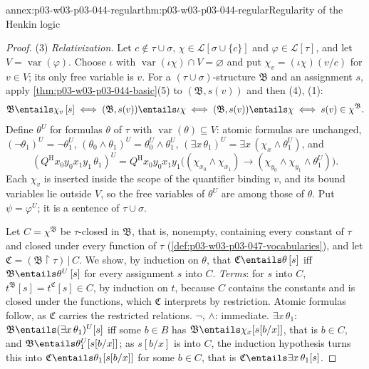\begin{annexitem}{annex:p03-w03-p03-044-regular}{thm:p03-w03-p03-044-regular}{Regularity of the Henkin logic}
\begin{proof}
(3) \emph{Relativization.}  Let \(c\notin\tau\cup\sigma\),
\(\chi\in\mathscr L[\sigma\cup\{c\}]\) and \(\varphi\in\mathscr L[\tau]\),
and let \(V=\operatorname{var}(\varphi)\).  Choose \(\iota\) with
\(\operatorname{var}(\iota\chi)\cap V=\varnothing\) and put
\(\chi_v=(\iota\chi)(v/c)\) for \(v\in V\); its only free variable is
\(v\).  For a \((\tau\cup\sigma)\)-structure \(\mathfrak B\) and an
assignment \(s\), apply \cref{thm:p03-w03-p03-044-basic}(5) to
\((\mathfrak B,s(v))\) and then (4), (1):
\[
 \mathfrak B\entails\chi_v\,[s]\iff(\mathfrak B,s(v))\entails\iota\chi
 \iff(\mathfrak B,s(v))\entails\chi\iff s(v)\in\chi^{\mathfrak B}.
\]
Define \(\theta^U\) for formulas \(\theta\) of \(\tau\) with
\(\operatorname{var}(\theta)\subseteq V\): atomic formulas are unchanged,
\((\neg\theta_1)^U=\neg\theta_1^U\),
\((\theta_0\land\theta_1)^U=\theta_0^U\land\theta_1^U\),
\((\exists x\,\theta_1)^U=\exists x\,(\chi_x\land\theta_1^U)\), and
\[
 (Q^{\mathrm H}x_0y_0x_1y_1\,\theta_1)^U=
 Q^{\mathrm H}x_0y_0x_1y_1\bigl((\chi_{x_0}\land\chi_{x_1})\to
 (\chi_{y_0}\land\chi_{y_1}\land\theta_1^U)\bigr).
\]
Each \(\chi_v\) is inserted inside the scope of the quantifier binding
\(v\), and its bound variables lie outside \(V\), so the free variables of
\(\theta^U\) are among those of \(\theta\).  Put \(\psi=\varphi^U\); it is a
sentence of \(\tau\cup\sigma\).

Let \(C=\chi^{\mathfrak B}\) be \(\tau\)-closed in \(\mathfrak B\), that is,
nonempty, containing every constant of \(\tau\) and closed under every
function of \(\tau\) (\cref{def:p03-w03-p03-047-vocabularies}), and let
\(\mathfrak C=(\mathfrak B\restriction\tau)\,|\,C\).  We show, by induction
on \(\theta\), that \(\mathfrak C\entails\theta\,[s]\) iff
\(\mathfrak B\entails\theta^U\,[s]\) for every assignment \(s\) into \(C\).
\emph{Terms}: for \(s\) into \(C\), \(t^{\mathfrak B}[s]=t^{\mathfrak C}[s]\in
C\), by induction on \(t\), because \(C\) contains the constants and is
closed under the functions, which \(\mathfrak C\) interprets by
restriction.  Atomic formulas follow, as \(\mathfrak C\) carries the
restricted relations.  \(\neg\), \(\land\): immediate.
\(\exists x\,\theta_1\): \(\mathfrak B\entails(\exists x\,\theta_1)^U[s]\)
iff some \(b\in B\) has \(\mathfrak B\entails\chi_x[s[b/x]]\), that is
\(b\in C\), and \(\mathfrak B\entails\theta_1^U[s[b/x]]\); as \(s[b/x]\)
is into \(C\), the induction hypothesis turns this into
\(\mathfrak C\entails\theta_1[s[b/x]]\) for some \(b\in C\), that is
\(\mathfrak C\entails\exists x\,\theta_1[s]\).


\end{proof}
\end{annexitem}
